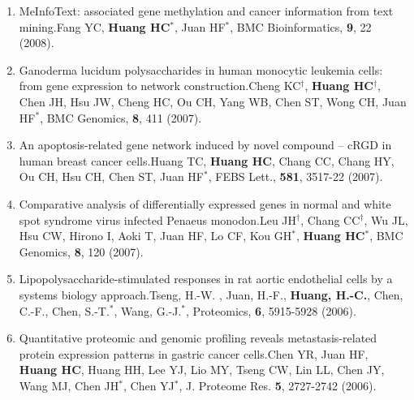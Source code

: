 \documentclass[10pt,a4paper]{article}
\def\mypub#1#2#3{{#1.}\newline #2, #3.}
\def\cited#1{Cited $\ge$ #1}
\def\impf#1#2{\def\tempa{}\def\tempb{#2}\ifx\tempa\tempb%
IF: #1%
\else
IF: #1, #2\%%
\fi
}
\def\ibmcgenomics{\impf{3.926}{16.67}}
\def\ibmcbioinfo{\impf{3.493}{11.1}}
\def\iproteomics{\impf{4.586}{12.31}}
\def\ifebslett{\impf{3.263}{27.5}}
\def\ijpr{\impf{5.684}{}} %
\begin{document}
\begin{enumerate}
\item
\mypub{MeInfoText: associated gene methylation and cancer information from text mining}
{Fang YC, {\bf Huang HC$^{*}$}, Juan HF$^{*}$}
{BMC Bioinformatics, {\bf 9}, 22 (2008)} 

\item
\mypub{{Ganoderma lucidum} polysaccharides in human monocytic leukemia cells: from gene expression to network construction}
{Cheng KC$^{\dagger}$, {\bf Huang HC$^{\dagger}$}, Chen JH, Hsu JW, Cheng HC, Ou CH, Yang WB, Chen ST, Wong CH, Juan HF$^{*}$}
{BMC Genomics, {\bf 8}, 411 (2007)}

\item
\mypub{An apoptosis-related gene network induced by novel compound -- cRGD in human breast cancer cells}
{Huang TC, {\bf Huang HC}, Chang CC, Chang HY, Ou CH, Hsu CH, Chen ST, Juan HF$^*$}
{FEBS Lett., {\bf 581}, 3517-22 (2007)}

\item
\mypub{Comparative analysis of differentially expressed genes in normal and white spot syndrome virus infected Penaeus monodon}
{Leu JH$^\dagger$, Chang CC$^\dagger$, Wu JL, Hsu CW, Hirono I, Aoki T, Juan HF, Lo CF, Kou GH$^*$, {\bf Huang HC$^*$}}
{BMC Genomics, {\bf 8}, 120 (2007)}

\item
\mypub{Lipopolysaccharide-stimulated responses in rat aortic endothelial cells by a systems biology approach}
{Tseng, H.-W. , Juan, H.-F., {\bf Huang, H.-C.}, Chen, C.-F., Chen, S.-T.$^*$, Wang, G.-J.$^*$}
{Proteomics, {\bf 6}, 5915-5928 (2006)} 

\item
\mypub
{Quantitative proteomic and genomic profiling reveals metastasis-related protein expression patterns in gastric cancer cells}
{Chen YR, Juan HF, {\bf Huang HC}, Huang HH, Lee YJ, Lio MY, Tseng CW, Lin LL, Chen JY, Wang MJ, Chen JH$^*$, Chen YJ$^*$}
{J. Proteome Res. {\bf 5}, 2727-2742 (2006)}


\end{enumerate}
\end{document}
